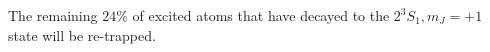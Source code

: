 \documentclass[%
 reprint,
 amsmath,amssymb,
 aps,
 prl,
]{revtex4-2}
\newcommand{\brycerev}[1]{{\color{Purple}{#1}\normalcolor}} %
\newcommand{\brycecom}[1]{{\color{ProcessBlue}[{#1}]\normalcolor}} %
\newcommand{\MetastableState}{2^{3\!}S_1}%
\begin{document}

The remaining \(24\%\) of excited atoms that have decayed to the \(\MetastableState, m_J=+1\) state will be re-trapped.

\end{document}
